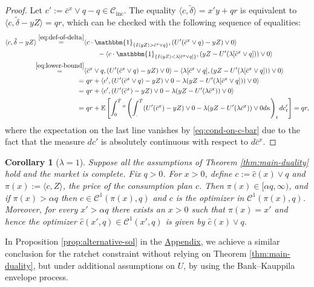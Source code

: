 \documentclass[11pt, oneside]{article}   	%
\theoremstyle{plain}
\newtheorem{cor}[thm]{Corollary}
\theoremstyle{definition}
\theoremstyle{remark}
\begin{document}
\begin{proof}
Let $c':=\bar{c}^{x}\vee q-q\in\mathcal{C}_{\text{inc}}$. The equality $\langle c,\tilde\delta\rangle=x'y+qr$ is equivalent to $\langle c, \tilde\delta - yZ\rangle =qr$, which can be checked with the following sequence of equalities:
\begin{equation*}
\begin{aligned}
\langle c, \tilde\delta - yZ\rangle \overset{\eqref{eq:def-of-delta}}{=}& \langle c\cdot\mathbbm{1}_{\{I(yZ)>\bar{c}^{x}\vee q\}},(U'(\bar{c}^{x}\vee q)-yZ)\vee 0\rangle\\
&\quad\quad-\langle c\cdot\mathbbm{1}_{\{I(yZ)<\lambda[\bar{c}^{x}\vee q]\}},(yZ-U'(\lambda [\bar{c}^{x}\vee q]))\vee0\rangle\\
\overset{\eqref{eq:lower-bound}}{=}&\langle \bar{c}^{x}\vee q,(U'(\bar{c}^{x}\vee q)-yZ)\vee 0\rangle-\langle \lambda[\bar{c}^{x}\vee q],(yZ-U'(\lambda [\bar{c}^{x}\vee q]))\vee0\rangle\\
=&\ qr+\langle c', (U'(\bar{c}^{x}\vee q)-yZ)\vee 0-\lambda (yZ-U'(\lambda [\bar{c}^{x}\vee q]))\vee0\rangle\\
=&\ qr+\langle c', (U'(\bar{c}^{x})-yZ)\vee 0-\lambda (yZ-U'(\lambda\bar{c}^{x}))\vee0\rangle\\
=&\ qr + \mathbb{E}\left[\int_0^{\hat{T}}{}^o\left(\int_.^{\hat{T}} (U'(\bar{c}^x)-yZ)\vee0 - \lambda(yZ-U'(\lambda\bar{c}^x))\vee 0 d\kappa\right)_tdc'_t\right]=qr,
\end{aligned}
\end{equation*}
where the expectation on the last line vanishes by \eqref{eq:cond-on-c-bar} due to the fact that the measure $dc'$ is absolutely continuous with respect to $d\bar{c}^x$.
\end{proof}

\begin{cor}[$\lambda=1$]\label{cor:q-positive}
Suppose all the assumptions of Theorem \ref{thm:main-duality} hold and the market is complete. Fix $q>0$. For $x>0$, define $c:=\hat{c}(x)\vee q$ and $\pi(x):=\langle c,Z\rangle$, the price of the consumption plan $c$. Then $\pi(x)\in[\alpha q,\infty)$, and if $\pi(x)>\alpha q$ then $c\in\mathcal{C}^1(\pi(x),q)$ and $c$ is the optimizer in $\mathcal{C}^1(\pi(x),q)$. Moreover, for every $x'>\alpha q$ there exists an $x>0$ such that $\pi(x)=x'$ and hence the optimizer $\hat{c}(x',q)\in\mathcal{C}^1(x',q)$ is given by $\hat{c}(x)\vee q$.
\end{cor}

In Proposition \ref{prop:alternative-sol} in the \hyperref[app:envelope]{Appendix}, we achieve a similar conclusion for the ratchet constraint without relying on Theorem \ref{thm:main-duality}, but under additional assumptions on $U$, by using the Bank--Kauppila envelope process.
\end{document}
